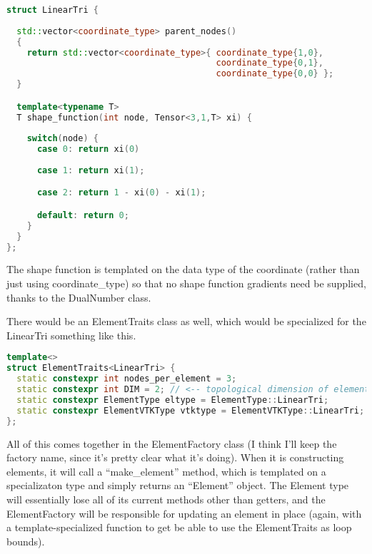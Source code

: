 \documentclass[11pt]{article}
\begin{document}
\begin{lstlisting}[language=C++]
struct LinearTri {
  
  std::vector<coordinate_type> parent_nodes()
  {
    return std::vector<coordinate_type>{ coordinate_type{1,0},
                                         coordinate_type{0,1},
                                         coordinate_type{0,0} };
  }

  template<typename T>
  T shape_function(int node, Tensor<3,1,T> xi) {
    
    switch(node) {
      case 0: return xi(0)
    
      case 1: return xi(1);

      case 2: return 1 - xi(0) - xi(1);

      default: return 0;
    }
  }
};
\end{lstlisting}

The shape function is templated on the data type of the coordinate
(rather than just using coordinate\_type) so that no shape function gradients
need be supplied, thanks to the DualNumber class.

There would be an ElementTraits class as well, which would be specialized
for the LinearTri something like this.

\begin{lstlisting}[language=C++]
template<>
struct ElementTraits<LinearTri> {
  static constexpr int nodes_per_element = 3;
  static constexpr int DIM = 2; // <-- topological dimension of element
  static constexpr ElementType eltype = ElementType::LinearTri;
  static constexpr ElementVTKType vtktype = ElementVTKType::LinearTri;
};
\end{lstlisting}



All of this comes together in the ElementFactory class
(I think I'll keep the factory name, since it's pretty clear what it's doing).
When it is constructing elements, it will call a ``make\_element'' method,
which is templated on a specializaton type and simply returns an ``Element'' object.
The Element type will essentially lose all of its current methods other than getters, 
and the ElementFactory will be responsible for updating an element in place 
(again, with a template-specialized function to get be able to use the 
ElementTraits as loop bounds).
\end{document}
